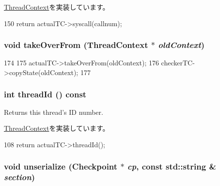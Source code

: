 \hyperlink{classThreadContext_ae5fdd7da5d82e981c65cbd6115dcfe60}{ThreadContext}を実装しています。


\begin{DoxyCode}
150     { return actualTC->syscall(callnum); }
\end{DoxyCode}
\hypertarget{classCheckerThreadContext_a5811640aa3008d2916f3d3aba621b82d}{
\subsubsection[{takeOverFrom}]{\setlength{\rightskip}{0pt plus 5cm}void takeOverFrom ({\bf ThreadContext} $\ast$ {\em oldContext})}}
\label{classCheckerThreadContext_a5811640aa3008d2916f3d3aba621b82d}



\begin{DoxyCode}
174     {
175         actualTC->takeOverFrom(oldContext);
176         checkerTC->copyState(oldContext);
177     }
\end{DoxyCode}
\hypertarget{classCheckerThreadContext_afc38d04c77e7b5fc3bbb0dd00fc87742}{
\subsubsection[{threadId}]{\setlength{\rightskip}{0pt plus 5cm}int threadId () const}}
\label{classCheckerThreadContext_afc38d04c77e7b5fc3bbb0dd00fc87742}
Returns this thread's ID number. 

\hyperlink{classThreadContext_a79882224329589b18076ee3f2f45d99f}{ThreadContext}を実装しています。


\begin{DoxyCode}
108 { return actualTC->threadId(); }
\end{DoxyCode}
\hypertarget{classCheckerThreadContext_af22e5d6d660b97db37003ac61ac4ee49}{
\subsubsection[{unserialize}]{\setlength{\rightskip}{0pt plus 5cm}void unserialize ({\bf Checkpoint} $\ast$ {\em cp}, \/  const std::string \& {\em section})}}
\label{classCheckerThreadContext_af22e5d6d660b97db37003ac61ac4ee49}



